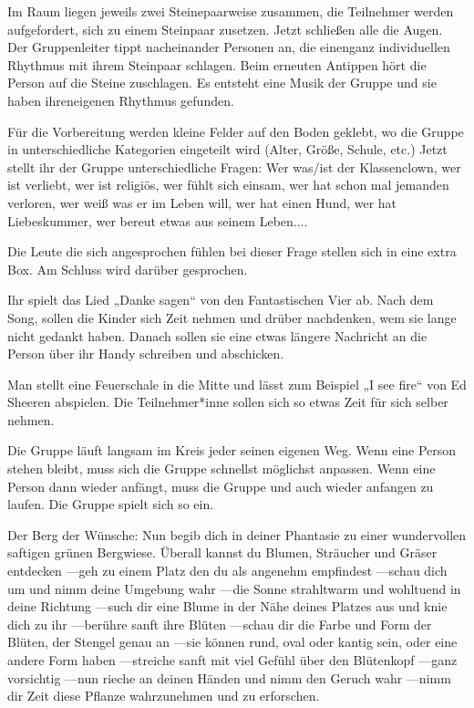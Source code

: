 \newpage
{}
Im Raum liegen jeweils zwei Steinepaarweise zusammen, die Teilnehmer werden aufgefordert, sich zu einem Steinpaar zusetzen. Jetzt schließen alle die Augen. Der Gruppenleiter tippt nacheinander Personen an, die einenganz individuellen Rhythmus mit ihrem Steinpaar schlagen. Beim erneuten Antippen hört die Person auf die Steine zuschlagen.  Es entsteht eine Musik der Gruppe und sie haben ihreneigenen Rhythmus gefunden. 

Für die Vorbereitung werden kleine Felder auf den Boden geklebt, wo die Gruppe in unterschiedliche Kategorien eingeteilt wird (Alter, Größe, Schule, etc.) Jetzt stellt ihr der Gruppe unterschiedliche Fragen: Wer was/ist der Klassenclown, wer ist verliebt, wer ist religiös, wer fühlt sich einsam, wer hat schon mal jemanden verloren, wer weiß was er im Leben will, wer hat einen Hund, wer hat Liebeskummer, wer bereut etwas aus seinem Leben....

Die Leute die sich angesprochen fühlen bei dieser Frage stellen sich in eine extra Box. Am Schluss wird darüber gesprochen.

Ihr spielt das Lied „Danke sagen“ von den Fantastischen Vier ab. Nach dem Song, sollen die Kinder sich Zeit nehmen und drüber nachdenken, wem sie lange nicht gedankt haben. Danach sollen sie eine etwas längere Nachricht an die Person über ihr Handy schreiben und abschicken. 

Man stellt eine Feuerschale in die Mitte und lässt zum Beispiel „I see fire“ von Ed Sheeren abspielen. Die Teilnehmer*inne sollen sich so etwas Zeit für sich selber nehmen.

Die Gruppe läuft langsam im Kreis jeder seinen eigenen Weg. Wenn eine Person stehen bleibt, muss sich die Gruppe schnellst möglichst anpassen. Wenn eine Person dann wieder anfängt, muss die Gruppe und auch wieder anfangen zu laufen. Die Gruppe spielt sich so ein.

Der Berg der Wünsche:
Nun begib dich in deiner Phantasie zu einer wundervollen saftigen grünen Bergwiese. Überall kannst du Blumen, Sträucher und Gräser entdecken —geh zu einem Platz den du als angenehm empfindest —schau dich um und nimm deine Umgebung wahr —die Sonne strahltwarm und wohltuend in deine Richtung —such dir eine Blume in der Nähe deines Platzes aus und knie dich zu ihr —berühre sanft ihre Blüten —schau dir die Farbe und Form der Blüten, der Stengel genau an —sie können rund, oval oder kantig sein, oder eine andere Form haben —streiche sanft mit viel Gefühl über den Blütenkopf —ganz vorsichtig —nun rieche an deinen Händen und nimm den Geruch wahr —nimm dir Zeit diese Pflanze wahrzunehmen und zu erforschen.\\

